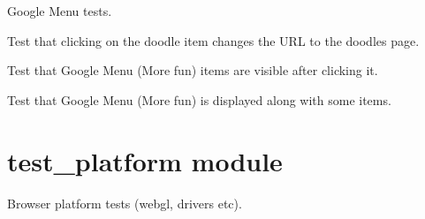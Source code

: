 \documentclass[letterpaper,10pt,english]{sphinxmanual}
\begin{document}
\begin{fulllineitems}
\label{test_google_menu:test_google_menu.TestGoogleMenu}
Google Menu tests.

\begin{fulllineitems}
\label{test_google_menu:test_google_menu.TestGoogleMenu.test_clicking_doodle_item}
Test that clicking on the doodle item changes the URL to the
doodles page.

\end{fulllineitems}


\begin{fulllineitems}
\label{test_google_menu:test_google_menu.TestGoogleMenu.test_google_items_are_visible_on_click}
Test that Google Menu (More fun) items are visible after clicking it.

\end{fulllineitems}


\begin{fulllineitems}
\label{test_google_menu:test_google_menu.TestGoogleMenu.test_google_menu_is_visible}
Test that Google Menu (More fun) is displayed along with some items.

\end{fulllineitems}


\end{fulllineitems}



\section{test\_platform module}
\label{test_platform:module-test_platform}\label{test_platform::doc}\label{test_platform:test-platform-module}
Browser platform tests (webgl, drivers etc).
\end{document}

